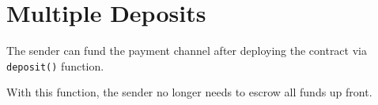 \section{Multiple Deposits}\label{sec:multiple-deposits}
The sender can fund the payment channel after deploying the contract via
\texttt{deposit()} function.



With this function, the sender no longer needs to escrow all funds up front.